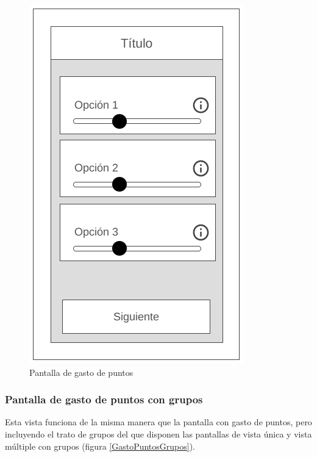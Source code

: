 \begin{figure}[H]
    \centering
    \includegraphics[scale=0.3]{Figures/Mockups/Mock_GastoPuntos.png}
    \caption{Pantalla de gasto de puntos}
    \label{GastoPuntos}    
\end{figure}

\subsubsection{Pantalla de gasto de puntos con grupos}
Esta vista funciona de la misma manera que la pantalla con gasto de puntos, pero incluyendo el trato de grupos del 
que disponen las pantallas de vista única y vista múltiple con grupos (figura \ref*{GastoPuntosGrupos}).

